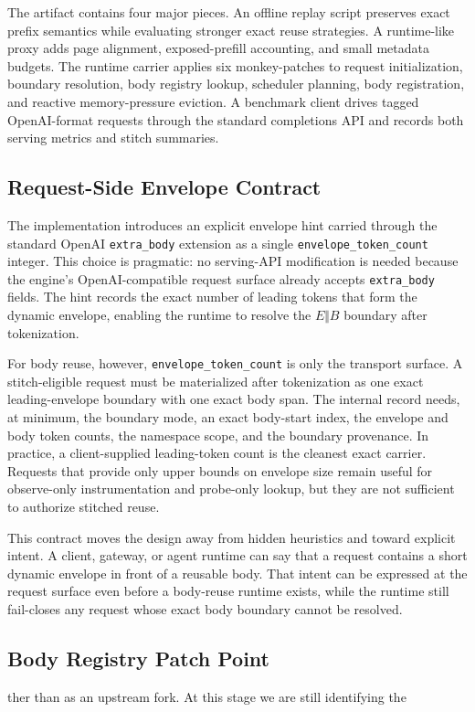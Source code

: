 \documentclass[conference]{IEEEtran}
\begin{document}
The artifact contains four major pieces. An offline replay script preserves exact prefix semantics while evaluating stronger exact reuse strategies. A runtime-like proxy adds page alignment, exposed-prefill accounting, and small metadata budgets. The runtime carrier applies six monkey-patches to request initialization, boundary resolution, body registry lookup, scheduler planning, body registration, and reactive memory-pressure eviction. A benchmark client drives tagged OpenAI-format requests through the standard completions API and records both serving metrics and stitch summaries.

\subsection{Request-Side Envelope Contract}

The implementation introduces an explicit envelope hint carried through the standard OpenAI \texttt{extra\_body} extension as a single \texttt{envelope\_token\_count} integer. This choice is pragmatic: no serving-API modification is needed because the engine's OpenAI-compatible request surface already accepts \texttt{extra\_body} fields. The hint records the exact number of leading tokens that form the dynamic envelope, enabling the runtime to resolve the $E \Vert B$ boundary after tokenization.

For body reuse, however, \texttt{envelope\_token\_count} is only the transport surface. A stitch-eligible request must be materialized after tokenization as one exact leading-envelope boundary with one exact body span. The internal record needs, at minimum, the boundary mode, an exact body-start index, the envelope and body token counts, the namespace scope, and the boundary provenance. In practice, a client-supplied leading-token count is the cleanest exact carrier. Requests that provide only upper bounds on envelope size remain useful for observe-only instrumentation and probe-only lookup, but they are not sufficient to authorize stitched reuse.

This contract moves the design away from hidden heuristics and toward explicit intent. A client, gateway, or agent runtime can say that a request contains a short dynamic envelope in front of a reusable body. That intent can be expressed at the request surface even before a body-reuse runtime exists, while the runtime still fail-closes any request whose exact body boundary cannot be resolved.

\subsection{Body Registry Patch Point}ther than as an upstream fork. At this stage we are still identifying the
\end{document}
